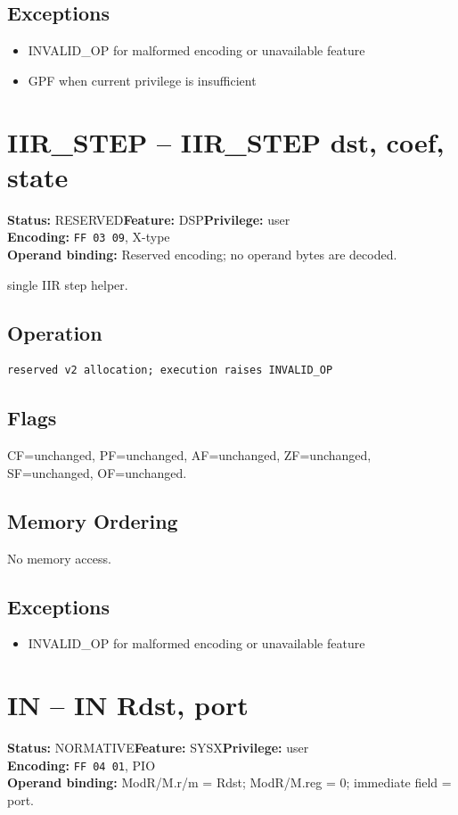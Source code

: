 \documentclass[10pt]{article}
\begin{document}
\subsection*{Exceptions}
\begin{itemize}
\item INVALID\_OP for malformed encoding or unavailable feature
\item GPF when current privilege is insufficient
\end{itemize}
\clearpage

\section{IIR\_STEP -- IIR\_STEP dst, coef, state}
\textbf{Status:} RESERVED\quad \textbf{Feature:} DSP\quad \textbf{Privilege:} user\\
\textbf{Encoding:} \texttt{FF 03 09}, X-type\\
\textbf{Operand binding:} Reserved encoding; no operand bytes are decoded.

single IIR step helper.

\subsection*{Operation}
\begin{lstlisting}
reserved v2 allocation; execution raises INVALID_OP
\end{lstlisting}
\subsection*{Flags}
CF=unchanged, PF=unchanged, AF=unchanged, ZF=unchanged, SF=unchanged, OF=unchanged.
\subsection*{Memory Ordering}
No memory access.
\subsection*{Exceptions}
\begin{itemize}
\item INVALID\_OP for malformed encoding or unavailable feature
\end{itemize}
\clearpage

\section{IN -- IN Rdst, port}
\textbf{Status:} NORMATIVE\quad \textbf{Feature:} SYSX\quad \textbf{Privilege:} user\\
\textbf{Encoding:} \texttt{FF 04 01}, PIO\\
\textbf{Operand binding:} ModR/M.r/m = Rdst; ModR/M.reg = 0; immediate field = port.
\end{document}

